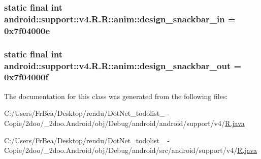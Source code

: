 \hypertarget{classandroid_1_1support_1_1v4_1_1_r_1_1anim_148a7ebbbe7b6c59c304842b4069a114}{
\subsubsection[{design\_\-snackbar\_\-in}]{\setlength{\rightskip}{0pt plus 5cm}static final int android::support::v4.R.R::anim::design\_\-snackbar\_\-in = 0x7f04000e}}
\label{classandroid_1_1support_1_1v4_1_1_r_1_1anim_148a7ebbbe7b6c59c304842b4069a114}


\hypertarget{classandroid_1_1support_1_1v4_1_1_r_1_1anim_8e6af702869770630ff0f1c614dc4a98}{
\subsubsection[{design\_\-snackbar\_\-out}]{\setlength{\rightskip}{0pt plus 5cm}static final int android::support::v4.R.R::anim::design\_\-snackbar\_\-out = 0x7f04000f}}
\label{classandroid_1_1support_1_1v4_1_1_r_1_1anim_8e6af702869770630ff0f1c614dc4a98}




The documentation for this class was generated from the following files:\begin{CompactItemize}
\item 
C:/Users/FrBea/Desktop/rendu/DotNet\_\-todolist\_ - Copie/2doo/\_\-2doo.Android/obj/Debug/android/android/support/v4/\hyperlink{android_2support_2v4_2_r_8java}{R.java}\item 
C:/Users/FrBea/Desktop/rendu/DotNet\_\-todolist\_ - Copie/2doo/\_\-2doo.Android/obj/Debug/android/src/android/support/v4/\hyperlink{src_2android_2support_2v4_2_r_8java}{R.java}\end{CompactItemize}
